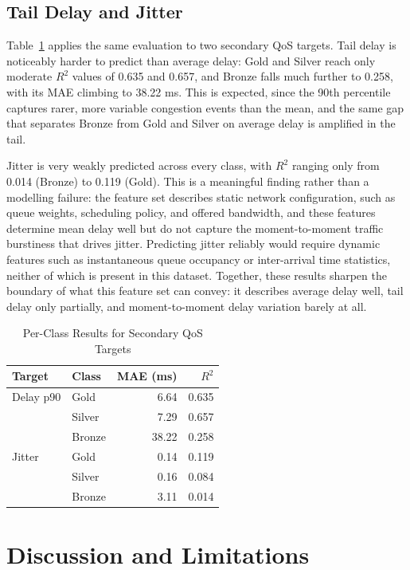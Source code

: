 \documentclass[conference]{IEEEtran}
\begin{document}
\subsection{Tail Delay and Jitter}

Table~\ref{tab:secondary} applies the same evaluation to two secondary QoS targets. Tail delay is noticeably harder to predict than average delay: Gold and Silver reach only moderate $R^2$ values of 0.635 and 0.657, and Bronze falls much further to 0.258, with its MAE climbing to 38.22 ms. This is expected, since the 90th percentile captures rarer, more variable congestion events than the mean, and the same gap that separates Bronze from Gold and Silver on average delay is amplified in the tail.

Jitter is very weakly predicted across every class, with $R^2$ ranging only from 0.014 (Bronze) to 0.119 (Gold). This is a meaningful finding rather than a modelling failure: the feature set describes static network configuration, such as queue weights, scheduling policy, and offered bandwidth, and these features determine mean delay well but do not capture the moment-to-moment traffic burstiness that drives jitter. Predicting jitter reliably would require dynamic features such as instantaneous queue occupancy or inter-arrival time statistics, neither of which is present in this dataset. Together, these results sharpen the boundary of what this feature set can convey: it describes average delay well, tail delay only partially, and moment-to-moment delay variation barely at all.

\begin{table}[t]
\caption{Per-Class Results for Secondary QoS Targets}
\label{tab:secondary}
\centering
\setlength{\tabcolsep}{5pt}
\begin{tabular}{llrr}
\toprule
Target & Class & MAE (ms) & $R^2$ \\
\midrule
Delay p90 & Gold    & 6.64  & 0.635 \\
          & Silver  & 7.29  & 0.657 \\
          & Bronze  & 38.22 & 0.258 \\
\midrule
Jitter    & Gold    & 0.14 & 0.119 \\
          & Silver  & 0.16 & 0.084 \\
          & Bronze  & 3.11 & 0.014 \\
\bottomrule
\end{tabular}
\end{table}

\section{Discussion and Limitations}
\end{document}
